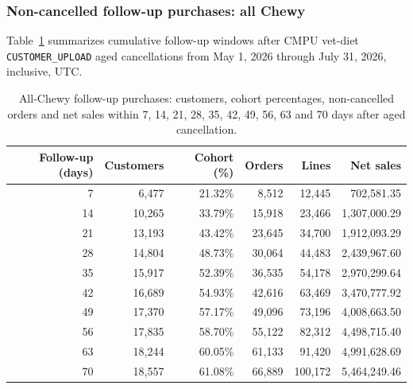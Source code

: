 \clearpage
\subsubsection{Non-cancelled follow-up purchases: all Chewy}
Table~\ref{tab:financial-opportunity-reorder-all-chewy} summarizes cumulative
follow-up windows after CMPU vet-diet \texttt{CUSTOMER\_UPLOAD} aged cancellations
from May 1, 2026 through July 31, 2026, inclusive, UTC.

\begin{table}[!htbp]
\centering
\caption{All-Chewy follow-up purchases: customers, cohort percentages, non-cancelled orders and net sales within 7, 14, 21, 28, 35, 42, 49, 56, 63 and 70 days after aged cancellation.}
\label{tab:financial-opportunity-reorder-all-chewy}
\begin{tabular}{@{}rrrrrr@{}}
\toprule
Follow-up (days) & Customers & Cohort (\%) & Orders & Lines & Net sales \\
\midrule
7 & 6,477 & 21.32\% & 8,512 & 12,445 & 702,581.35 \\
14 & 10,265 & 33.79\% & 15,918 & 23,466 & 1,307,000.29 \\
21 & 13,193 & 43.42\% & 23,645 & 34,700 & 1,912,093.29 \\
28 & 14,804 & 48.73\% & 30,064 & 44,483 & 2,439,967.60 \\
35 & 15,917 & 52.39\% & 36,535 & 54,178 & 2,970,299.64 \\
42 & 16,689 & 54.93\% & 42,616 & 63,469 & 3,470,777.92 \\
49 & 17,370 & 57.17\% & 49,096 & 73,196 & 4,008,663.50 \\
56 & 17,835 & 58.70\% & 55,122 & 82,312 & 4,498,715.40 \\
63 & 18,244 & 60.05\% & 61,133 & 91,420 & 4,991,628.69 \\
70 & 18,557 & 61.08\% & 66,889 & 100,172 & 5,464,249.46 \\
\bottomrule
\end{tabular}


\end{table}
